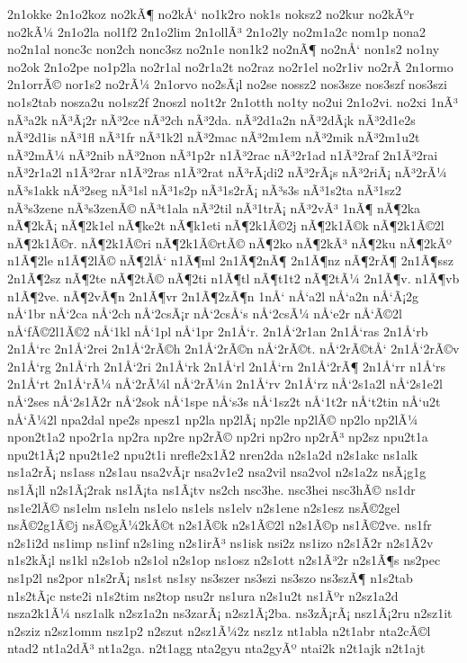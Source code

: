 {2n1okke
2n1o2koz
no2kÃ¶
no2kÅ‘
no1k2ro
nok1s
noksz2
no2kur
no2kÃºr
no2kÃ¼
2n1o2la
nol1f2
2n1o2lim
2n1ollÃ³
2n1o2ly
no2m1a2c
nom1p
nona2
no2n1al
nonc3c
non2ch
nonc3sz
no2n1e
non1k2
no2nÃ¶
no2nÅ‘
non1s2
no1ny
no2ok
2n1o2pe
no1p2la
no2r1al
no2r1a2t
no2raz
no2r1el
no2r1iv
no2rÃ­
2n1ormo
2n1orrÃ©
nor1s2
no2rÃ¼
2n1orvo
no2sÃ¡l
no2se
nossz2
nos3sze
nos3szf
nos3szi
no1s2tab
nosza2u
no1sz2f
2noszl
no1t2r
2n1otth
no1ty
no2ui
2n1o2vi.
no2xi
1nÃ³
nÃ³a2k
nÃ³Ã¡2r
nÃ³2ce
nÃ³2ch
nÃ³2da.
nÃ³2d1a2n
nÃ³2dÃ¡k
nÃ³2d1e2s
nÃ³2d1is
nÃ³1fl
nÃ³1fr
nÃ³1k2l
nÃ³2mac
nÃ³2m1em
nÃ³2mik
nÃ³2m1u2t
nÃ³2mÃ¼
nÃ³2nib
nÃ³2non
nÃ³1p2r
n1Ã³2rac
nÃ³2r1ad
n1Ã³2raf
2n1Ã³2rai
nÃ³2r1a2l
n1Ã³2rar
n1Ã³2ras
n1Ã³2rat
nÃ³rÃ¡di2
nÃ³2rÃ¡s
nÃ³2riÃ¡
nÃ³2rÃ¼
nÃ³s1akk
nÃ³2seg
nÃ³1sl
nÃ³1s2p
nÃ³1s2rÃ¡
nÃ³s3s
nÃ³1s2ta
nÃ³1sz2
nÃ³s3zene
nÃ³s3zenÃ©
nÃ³t1ala
nÃ³2til
nÃ³1trÃ¡
nÃ³2vÃ³
1nÃ¶
nÃ¶2ka
nÃ¶2kÃ¡
nÃ¶2k1el
nÃ¶ke2t
nÃ¶k1eti
nÃ¶2k1Ã©2j
nÃ¶2k1Ã©k
nÃ¶2k1Ã©2l
nÃ¶2k1Ã©r.
nÃ¶2k1Ã©ri
nÃ¶2k1Ã©rtÃ©
nÃ¶2ko
nÃ¶2kÃ³
nÃ¶2ku
nÃ¶2kÃº
n1Ã¶2le
n1Ã¶2lÃ©
nÃ¶2lÅ‘
n1Ã¶ml
2n1Ã¶2nÃ¶
2n1Ã¶nz
nÃ¶2rÃ¶
2n1Ã¶ssz
2n1Ã¶2sz
nÃ¶2te
nÃ¶2tÃ©
nÃ¶2ti
n1Ã¶tl
nÃ¶t1t2
nÃ¶2tÃ¼
2n1Ã¶v.
n1Ã¶vb
n1Ã¶2ve.
nÃ¶2vÃ¶n
2n1Ã¶vr
2n1Ã¶2zÃ¶n
1nÅ‘
nÅ‘a2l
nÅ‘a2n
nÅ‘Ã¡2g
nÅ‘1br
nÅ‘2ca
nÅ‘2ch
nÅ‘2csÃ¡r
nÅ‘2csÅ‘s
nÅ‘2csÃ¼
nÅ‘e2r
nÅ‘Ã©2l
nÅ‘fÃ©2l1Ã©2
nÅ‘1kl
nÅ‘1pl
nÅ‘1pr
2n1Å‘r.
2n1Å‘2r1an
2n1Å‘ras
2n1Å‘rb
2n1Å‘rc
2n1Å‘2rei
2n1Å‘2rÃ©h
2n1Å‘2rÃ©n
nÅ‘2rÃ©t.
nÅ‘2rÃ©tÅ‘
2n1Å‘2rÃ©v
2n1Å‘rg
2n1Å‘rh
2n1Å‘2ri
2n1Å‘rk
2n1Å‘rl
2n1Å‘rn
2n1Å‘2rÃ¶
2n1Å‘rr
n1Å‘rs
2n1Å‘rt
2n1Å‘rÃ¼
nÅ‘2rÃ¼l
nÅ‘2rÃ¼n
2n1Å‘rv
2n1Å‘rz
nÅ‘2s1a2l
nÅ‘2s1e2l
nÅ‘2ses
nÅ‘2s1Ã­2r
nÅ‘2sok
nÅ‘1spe
nÅ‘s3s
nÅ‘1sz2t
nÅ‘1t2r
nÅ‘t2tin
nÅ‘u2t
nÅ‘Ã¼2l
npa2dal
npe2s
npesz1
np2la
np2lÃ¡
np2le
np2lÃ©
np2lo
np2lÃ¼
npon2t1a2
npo2r1a
np2ra
np2re
np2rÃ©
np2ri
np2ro
np2rÃ³
np2sz
npu2t1a
npu2t1Ã¡2
npu2t1e2
npu2t1i
nrefle2x1Ã­2
nren2da
n2s1a2d
n2s1akc
ns1alk
ns1a2rÃ¡
ns1ass
n2s1au
nsa2vÃ¡r
nsa2v1e2
nsa2vil
nsa2vol
n2s1a2z
nsÃ¡g1g
ns1Ã¡ll
n2s1Ã¡2rak
ns1Ã¡ta
ns1Ã¡tv
ns2ch
nsc3he.
nsc3hei
nsc3hÃ©
ns1dr
ns1e2lÃ©
ns1elm
ns1eln
ns1elo
ns1els
ns1elv
n2s1ene
n2s1esz
nsÃ©2gel
nsÃ©2g1Ã©j
nsÃ©gÃ¼2kÃ©t
n2s1Ã©k
n2s1Ã©2l
n2s1Ã©p
ns1Ã©2ve.
ns1fr
n2s1i2d
ns1imp
ns1inf
n2s1ing
n2s1irÃ³
ns1isk
nsi2z
ns1izo
n2s1Ã­2r
n2s1Ã­2v
n1s2kÃ¡l
ns1kl
n2s1ob
n2s1ol
n2s1op
ns1osz
n2s1ott
n2s1Ã³2r
n2s1Ã¶s
ns2pec
ns1p2l
ns2por
n1s2rÃ¡
ns1st
ns1sy
ns3szer
ns3szi
ns3szo
ns3szÃ¶
n1s2tab
n1s2tÃ¡c
nste2i
n1s2tim
ns2top
nsu2r
ns1ura
n2s1u2t
ns1Ãºr
n2sz1a2d
nsza2k1Ã¼
nsz1alk
n2sz1a2n
ns3zarÃ¡
n2sz1Ã¡2ba.
ns3zÃ¡rÃ¡
nsz1Ã¡2ru
n2sz1it
n2sziz
n2sz1omm
nsz1p2
n2szut
n2sz1Ã¼2z
nsz1z
nt1abla
n2t1abr
nta2cÃ©l
ntad2
nt1a2dÃ³
nt1a2ga.
n2t1agg
nta2gyu
nta2gyÃº
ntai2k
n2t1ajk
n2t1ajt
}
